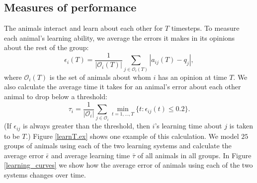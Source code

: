  
\subsection{Measures of performance }
The animals interact and learn about each other for $T$ timesteps. To measure each animal's learning ability, we average the errors it makes in its opinions about the rest of the group: 
\begin{equation*}
\epsilon_i(T) = \frac{1}{|\mathscr{O}_i(T)|}\sum_{j\in \mathscr{O}_i(T)}|a_{ij}(T)-q_j|,
\end{equation*}
where $\mathscr{O}_i(T)$ is the set of animals about whom $i$ has an opinion at time $T$.  
We also calculate the average time it takes for an animal's error about each other animal to drop below a threshold:
\begin{equation*}
\tau_{i} = \frac{1}{|\mathscr{O}_i|} \sum_{j\in\mathscr{O}_i} \min_{t=1,\dots,T}\{t: \epsilon_{ij}(t)\leq 0.2 \}.
\end{equation*}
(If $\epsilon_{ij}$ is always greater than the threshold, then $i$'s learning time about $j$ is taken to be $T$.) Figure \ref{learnT.ex} shows one example of this calculation. We model $25$ groups of animals using each of the two learning systems and calculate the average error $\bar{\epsilon}$ and average learning time $\bar{\tau}$ of all animals in all groups. In Figure \ref{learning_curves} we show how the average error of animals using each of the two systems changes over time.

